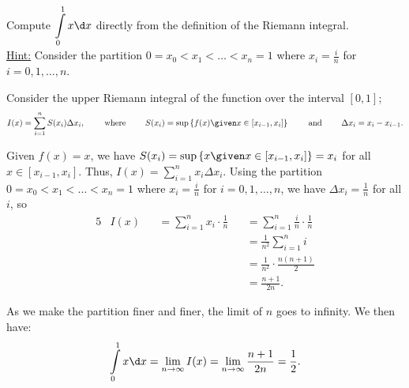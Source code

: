\begin{problem}
  Compute $\displaystyle \int\limits_0^1 x \d x$ directly from the definition of the Riemann integral.\\
  \underline{Hint:} Consider the partition $0 = x_0 < x_1 < \ldots < x_n = 1$
  where $x_i = \frac{i}{n}$ for $i = 0, 1, \ldots, n$.
\end{problem}

\begin{answer}
  Consider the upper Riemann integral of the function 
  over the interval $[0, 1]$;
  \[
    I(x) = \sum_{i=1}^n S(x_i) \Delta x_i,
    \qquad \text{ where }
    \qquad S(x_i) = \sup \set{ f(x) \given x \in [x_{i-1}, x_i]}
    \qquad \text{ and }
    \qquad \Delta x_i = x_i - x_{i-1}.
  \]

  Given $f(x) = x$, we have $S(x_i) = \sup \set{ x \given x \in [x_{i-1}, x_i]} = x_i$
  for all $x \in [x_{i-1}, x_i]$.
  Thus, $I(x) = \sum_{i=1}^n x_i \Delta x_i$.
  Using the partition $0 = x_0 < x_1 < \ldots < x_n = 1$ where $x_i = \frac{i}{n}$ for $i = 0, 1, \ldots, n$,
  we have $\Delta x_i = \frac{1}{n}$ for all $i$,
  so
  \begin{alignat*}{5}
    &I(x) &&= \sum_{i=1}^n x_i \cdot \frac{1}{n} &&= \sum_{i=1}^n \frac{i}{n} \cdot \frac{1}{n} \\
    &     &&    &&= \frac{1}{n^2} \sum_{i=1}^n i \\
    &     &&    &&= \frac{1}{n^2} \cdot \frac{n(n+1)}{2} \\
    &     &&    &&= \frac{n+1}{2n}.
  \end{alignat*}

  As we make the partition finer and finer, the limit of $n$ goes to infinity.
  We then have:
  \[
    \int\limits_0^1 x \d x = \lim_{n \to \infty} I(x) = \lim_{n \to \infty} \frac{n+1}{2n} = \frac{1}{2}.
  \]
\end{answer}
